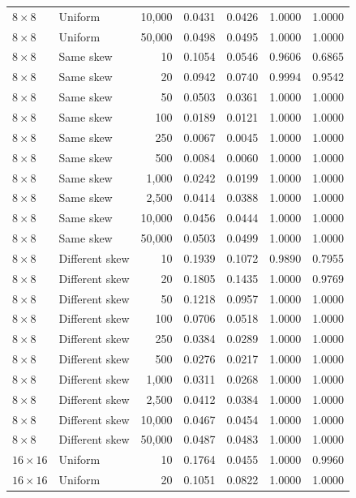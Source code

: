 \begin{longtable}{@{}llrrrrr@{}}
\(8\times8\) & Uniform & 10,000 & 0.0431 & 0.0426 & 1.0000 & 1.0000\\
\(8\times8\) & Uniform & 50,000 & 0.0498 & 0.0495 & 1.0000 & 1.0000\\
\(8\times8\) & Same skew & 10 & 0.1054 & 0.0546 & 0.9606 & 0.6865\\
\(8\times8\) & Same skew & 20 & 0.0942 & 0.0740 & 0.9994 & 0.9542\\
\(8\times8\) & Same skew & 50 & 0.0503 & 0.0361 & 1.0000 & 1.0000\\
\(8\times8\) & Same skew & 100 & 0.0189 & 0.0121 & 1.0000 & 1.0000\\
\(8\times8\) & Same skew & 250 & 0.0067 & 0.0045 & 1.0000 & 1.0000\\
\(8\times8\) & Same skew & 500 & 0.0084 & 0.0060 & 1.0000 & 1.0000\\
\(8\times8\) & Same skew & 1,000 & 0.0242 & 0.0199 & 1.0000 & 1.0000\\
\(8\times8\) & Same skew & 2,500 & 0.0414 & 0.0388 & 1.0000 & 1.0000\\
\(8\times8\) & Same skew & 10,000 & 0.0456 & 0.0444 & 1.0000 & 1.0000\\
\(8\times8\) & Same skew & 50,000 & 0.0503 & 0.0499 & 1.0000 & 1.0000\\
\(8\times8\) & Different skew & 10 & 0.1939 & 0.1072 & 0.9890 & 0.7955\\
\(8\times8\) & Different skew & 20 & 0.1805 & 0.1435 & 1.0000 & 0.9769\\
\(8\times8\) & Different skew & 50 & 0.1218 & 0.0957 & 1.0000 & 1.0000\\
\(8\times8\) & Different skew & 100 & 0.0706 & 0.0518 & 1.0000 & 1.0000\\
\(8\times8\) & Different skew & 250 & 0.0384 & 0.0289 & 1.0000 & 1.0000\\
\(8\times8\) & Different skew & 500 & 0.0276 & 0.0217 & 1.0000 & 1.0000\\
\(8\times8\) & Different skew & 1,000 & 0.0311 & 0.0268 & 1.0000 & 1.0000\\
\(8\times8\) & Different skew & 2,500 & 0.0412 & 0.0384 & 1.0000 & 1.0000\\
\(8\times8\) & Different skew & 10,000 & 0.0467 & 0.0454 & 1.0000 & 1.0000\\
\(8\times8\) & Different skew & 50,000 & 0.0487 & 0.0483 & 1.0000 & 1.0000\\
\midrule
\(16\times16\) & Uniform & 10 & 0.1764 & 0.0455 & 1.0000 & 0.9960\\
\(16\times16\) & Uniform & 20 & 0.1051 & 0.0822 & 1.0000 & 1.0000\\

\end{longtable}

